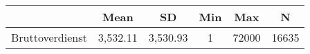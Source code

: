 {
\def\sym#1{\ifmmode^{#1}\else\(^{#1}\)\fi}
\begin{tabular}{l*{1}{ccccc}}
\toprule
                    &        Mean&          SD&         Min&         Max&           N\\
\midrule
Bruttoverdienst     &    3,532.11&    3,530.93&           1&       72000&       16635\\
\bottomrule
\end{tabular}
}
